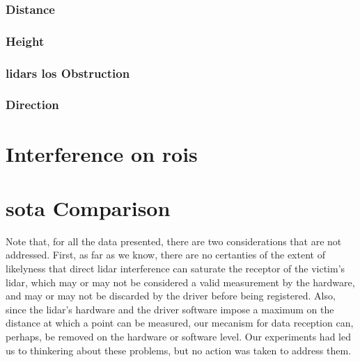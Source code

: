 \subsubsection{Distance}
\subsubsection{Height}
\subsubsection{\acp{lidar} \ac{los} Obstruction}
\subsubsection{Direction}

\section{Interference on \acp{roi}}

\section{\acl{sota} Comparison}
Note that, for all the data presented, there are two considerations that are not addressed. First, as far as we know, there are no certanties of the extent of likelyness that direct \ac{lidar} interference can saturate the receptor of the victim's \ac{lidar}, which may or may not be considered a valid measurement by the hardware, and may or may not be discarded by the driver before being registered. Also, since the \ac{lidar}'s hardware and the driver software impose a maximum on the distance at which a point can be measured, our mecanism for data reception can, perhaps, be removed on the hardware or software level. Our experiments had led us to thinkering about these problems, but no action was taken to address them.
